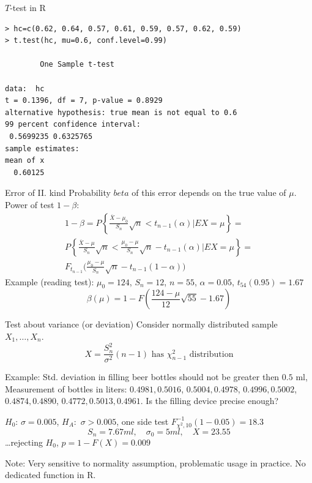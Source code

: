 \documentclass[smaller]{beamer}
\def\ol#1{\overline{#1}}
\def\blue#1{{\usebeamercolor[fg]{my blue} #1}}
\def\xskip{{\vspace{2ex}}}
\begin{document}
\begin{frame}[fragile]{$T$-test in R}
\begin{verbatim}
> hc=c(0.62, 0.64, 0.57, 0.61, 0.59, 0.57, 0.62, 0.59)
> t.test(hc, mu=0.6, conf.level=0.99)

        One Sample t-test

data:  hc 
t = 0.1396, df = 7, p-value = 0.8929
alternative hypothesis: true mean is not equal to 0.6 
99 percent confidence interval:
 0.5699235 0.6325765 
sample estimates:
mean of x 
  0.60125  
\end{verbatim}
\end{frame}

\begin{frame}{Error of II. kind}
Probability $beta$ of this error depends on the true value of $\mu$. Power of test $1-\beta$:
\begin{multline*}
  1-\beta=P\left\{ \frac{\ol{X} -\mu_0}{S_n}\sqrt{n} < t_{n-1}(\alpha)| EX=\mu \right\} = \\
  P\left\{ \frac{\ol{X} -\mu}{S_n}\sqrt{n} < \frac{\mu_0-\mu}{S_n}\sqrt{n}-t_{n-1}(\alpha)| EX=\mu \right\} =\\
  F_{t_{n-1}}\Big(\frac{\mu_0-\mu}{S_n}\sqrt{n}-t_{n-1}(1-\alpha) \Big)
\end{multline*}
\blue{Example (reading test):}
  $\mu_0=124$, $S_n = 12$, $n=55$, $\alpha=0.05$, $t_{54}(0.95) = 1.67$ \\
  \[
    \beta(\mu)=1-F(\frac{124-\mu}{12}\sqrt{55} - 1.67)
  \]

\end{frame}



\begin{frame}{Test about variance (or deviation)}
Consider normally distributed sample $X_1, \dots, X_n$.
\[
  X = \frac{S_n^2}{\sigma^2} (n-1) \text{ has $\chi_{n-1}^2$ distribution}
\]

\blue{Example: } Std. deviation in filling beer bottles should not be greater then $0.5$ ml,
Measurement of bottles in liters: $0.4981, 0.5016$, $0.5004, 0.4978$,
$0.4996,0.5002$, $0.4874, 0.4890$, $0.4772, 0.5013, 0.4961$. Is the filling device precise enough?

\xskip
$H_0$: $\sigma = 0.005$, $H_A:$ $\sigma > 0.005$, one side test
$F^{-1}_{\chi^2, 10}(1-0.05) = 18.3$
\[
 S_n = 7.67 ml,\quad \sigma_0 = 5 ml,\quad X=23.55
\]
\dots rejecting $H_0$, $p=1-F(X)=0.009$ 

\xskip
Note: Very sensitive to normality assumption, problematic usage in practice. No dedicated function in R.

\end{frame}
\end{document}
